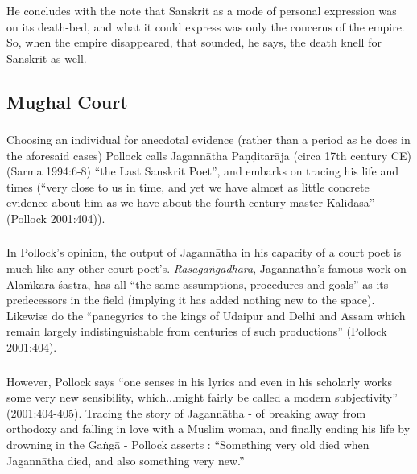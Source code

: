 \subsubsection{} He concludes with the note that Sanskrit as a mode of personal expression was on its death-bed, and what it could express was only the concerns of the empire. So, when the empire disappeared, that sounded, he says, the death knell for Sanskrit as well. 
\vskip -40pt

\subsection{Mughal Court}
\vskip -5pt

\subsubsection{} Choosing an individual for anecdotal evidence (rather than a period as he does in the aforesaid cases) Pollock calls Jagannātha Paṇḍitarāja (circa 17th century CE) (Sarma 1994:6-8) “the Last Sanskrit Poet”, and embarks on tracing his life and times (“very close to us in time, and yet we have almost as little concrete evidence about him as we have about the fourth-century master Kālidāsa” (Pollock 2001:404)).

\subsubsection{} In Pollock’s opinion, the output of Jagannātha in his capacity of a court poet is much like any other court poet’s. {\sl Rasagaṅgādhara}, Jagannātha’s famous work on Alaṁkāra-śāstra, has all “the same assumptions, procedures and goals” as its predecessors in the field (implying it has added nothing new to the space). Likewise do the “panegyrics to the kings of Udaipur and Delhi and Assam which remain largely indistinguishable from centuries of such productions” (Pollock 2001:404).

\subsubsection{} However, Pollock says “one senses in his lyrics and even in his scholarly works some very new sensibility, which...might fairly be called a modern subjectivity” (2001:404-405). Tracing the story of Jagannātha - of breaking away from orthodoxy and falling in love with a Muslim woman, and finally ending his life by drowning in the Gaṅgā -  Pollock asserts : “Something very old died when Jagannātha died, and also something very new.”

